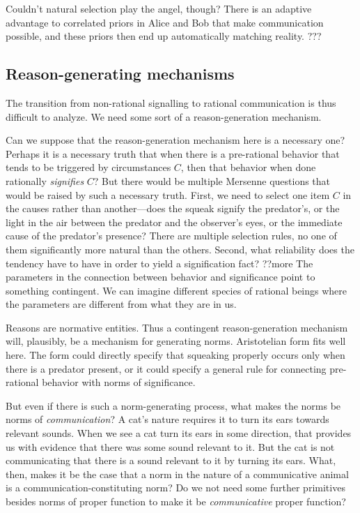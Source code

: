 Couldn't natural selection play the angel, though? There is an adaptive advantage to correlated priors in Alice and Bob 
that make communication possible, and these priors then end up automatically matching reality. ???

\subsection{Reason-generating mechanisms}
The transition from non-rational signalling to rational communication is thus difficult to analyze. We need some sort of 
a reason-generation mechanism.

Can we suppose that the reason-generation mechanism here is a necessary one? Perhaps it is a necessary truth that when
there is a pre-rational behavior that tends to be triggered by circumstances $C$, then that behavior when done rationally
\textit{signifies} $C$? But there would be multiple Mersenne questions that would be raised by such a necessary truth. First,
we need to select one item $C$ in the causes rather than another---does the squeak signify the predator's, or the
light in the air between the predator and the observer's eyes, or the immediate cause of the predator's presence? There are
multiple selection rules, no one of them significantly more natural than the others. Second, what reliability does the 
tendency have to have in order to yield a signification fact? ??more The parameters in the connection between behavior and
significance point to something contingent. We can imagine different species of rational beings where the parameters are
different from what they are in us. 

Reasons are normative entities. Thus a contingent reason-generation mechanism will, plausibly, be a mechanism for generating
norms. Aristotelian form fits well here. The form could directly specify that squeaking properly occurs only when there is a 
predator present, or it could specify a general rule for connecting pre-rational behavior with norms of significance. 

But even if there is such a norm-generating process, what makes the norms be norms of \textit{communication}? A cat's nature 
requires it to turn its ears towards relevant sounds. When we see a cat turn its ears in some direction, that provides us with 
evidence that there was some sound relevant to it. But the cat is not communicating that there is a sound relevant to it by
turning its ears. What, then, makes it be the case that a norm in the nature of a communicative animal is a communication-constituting
norm? Do we not need some further primitives besides norms of proper function to make it be \textit{communicative} proper function?

